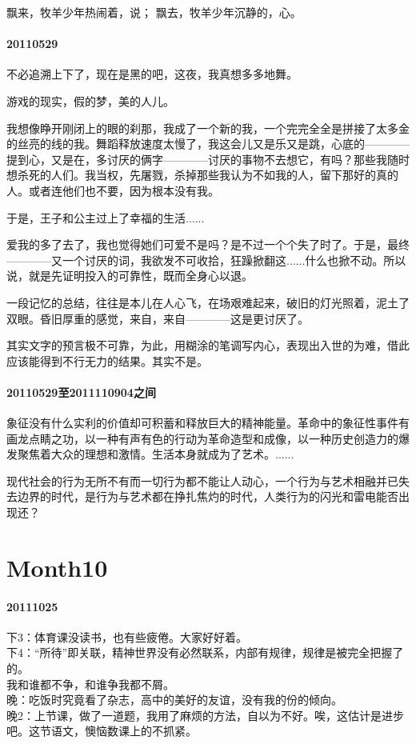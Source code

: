 \documentclass[UTF8]{Diaries}
\begin{document}
飘来，牧羊少年热闹着，说；
飘去，牧羊少年沉静的，心。


\paragraph{20110529}

不必追溯上下了，现在是黑的吧，这夜，我真想多多地舞。

游戏的现实，假的梦，美的人儿。

我想像睁开刚闭上的眼的刹那，我成了一个新的我，一个完完全全是拼接了太多金的丝亮的线的我。舞蹈释放速度太慢了，我这会儿又是乐又是跳，心底的————提到心，又是在，多讨厌的俩字————讨厌的事物不去想它，有吗？那些我随时想杀死的人们。我当权，先屠戮，杀掉那些我认为不如我的人，留下那好的真的人。或者连他们也不要，因为根本没有我。

于是，王子和公主过上了幸福的生活......

爱我的多了去了，我也觉得她们可爱不是吗？是不过一个个失了时了。于是，最终————又一个讨厌的词，我欲发不可收拾，狂躁掀翻这......什么也掀不动。所以说，就是先证明投入的可靠性，既而全身心以退。

一段记忆的总结，往往是本儿在人心飞，在场艰难起来，破旧的灯光照着，泥土了双眼。昏旧厚重的感觉，来自，来自————这是更讨厌了。

其实文字的预言极不可靠，为此，用糊涂的笔调写内心，表现出入世的为难，借此应该能得到不行无力的结果。其实不是。


\paragraph{20110529至2011110904之间}

象征没有什么实利的价值却可积蓄和释放巨大的精神能量。革命中的象征性事件有画龙点睛之功，以一种有声有色的行动为革命造型和成像，以一种历史创造力的爆发聚焦着大众的理想和激情。生活本身就成为了艺术。......

现代社会的行为无所不有而一切行为都不能让人动心，一个行为与艺术相融并已失去边界的时代，是行为与艺术都在挣扎焦灼的时代，人类行为的闪光和雷电能否出现还？


 





\section{Month10}
\paragraph{20111025}
下3：体育课没读书，也有些疲倦。大家好好着。\\
下4：“所待”即关联，精神世界没有必然联系，内部有规律，规律是被完全把握了的。\\
我和谁都不争，和谁争我都不屑。\\
晚：吃饭时究竟看了杂志，高中的美好的友谊，没有我的份的倾向。\\
晚2：上节课，做了一道题，我用了麻烦的方法，自以为不好。唉，这估计是进步吧。这节语文，懊恼数课上的不抓紧。
\end{document}
